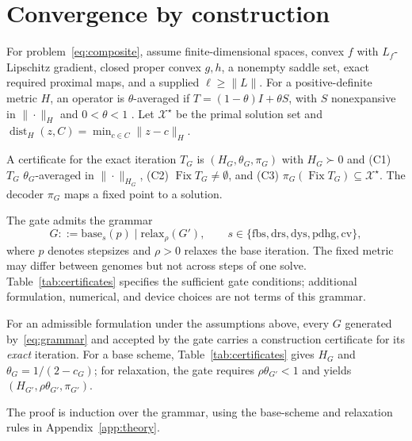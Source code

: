 \section{Convergence by construction}
\label{sec:theory}

For problem~\eqref{eq:composite}, assume finite-dimensional spaces, convex $f$ with $L_f$-Lipschitz gradient, closed proper convex $g,h$, a nonempty saddle set, exact required proximal maps, and a supplied $\ell\ge\|L\|$. For a positive-definite metric $H$, an operator is $\theta$-averaged if $T=(1-\theta)I+\theta S$, with $S$ nonexpansive in $\|\cdot\|_H$ and $0<\theta<1$ \citep{RyuYin2022LargeScale}. Let $\mathcal X^\star$ be the primal solution set and $\operatorname{dist}_H(z,C)=\min_{c\in C}\|z-c\|_H$.

\begin{definition}
\label{def:certificate}
A certificate for the exact iteration $T_G$ is $(H_G,\theta_G,\pi_G)$ with $H_G\succ0$ and (C1) $T_G$ $\theta_G$-averaged in $\|\cdot\|_{H_G}$, (C2) $\operatorname{Fix}T_G\ne\emptyset$, and (C3) $\pi_G(\operatorname{Fix}T_G)\subseteq\mathcal X^\star$. The decoder $\pi_G$ maps a fixed point to a solution.
\end{definition}

The gate admits the grammar
\begin{equation}
G::=\mathrm{base}_s(p)\mid\mathrm{relax}_{\rho}(G'),\qquad
s\in\{\mathrm{fbs},\mathrm{drs},\mathrm{dys},\mathrm{pdhg},\mathrm{cv}\},
\label{eq:grammar}
\end{equation}
where $p$ denotes stepsizes and $\rho>0$ relaxes the base iteration. The fixed metric may differ between genomes but not across steps of one solve. Table~\ref{tab:certificates} specifies the sufficient gate conditions; additional formulation, numerical, and device choices are not terms of this grammar.

\begin{theorem}
\label{thm:soundness}
For an admissible formulation under the assumptions above, every $G$ generated by~\eqref{eq:grammar} and accepted by the gate carries a construction certificate for its \emph{exact} iteration. For a base scheme, Table~\ref{tab:certificates} gives $H_G$ and $\theta_G=1/(2-c_G)$; for relaxation, the gate requires $\rho\theta_{G'}<1$ and yields $(H_{G'},\rho\theta_{G'},\pi_{G'})$.
\end{theorem}
The proof is induction over the grammar, using the base-scheme and relaxation rules in Appendix~\ref{app:theory}.

